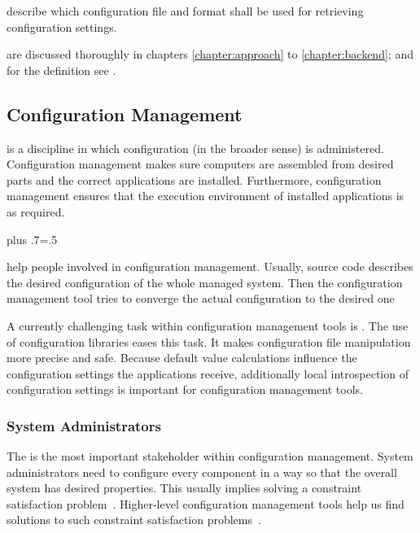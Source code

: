 \begin{description}[font=\textintro]
\item[Access specification] 
describe which configuration file and format shall be used for retrieving configuration settings.

\item[Context specifications] 
are discussed thoroughly in chapters \ref{chapter:approach} to \ref{chapter:backend}; and for the definition see .
\end{description}


\subsection{Configuration Management}
\label{sec:background-configuration-management}

is a discipline in which configuration (in the broader sense) is administered.
Configuration management makes sure computers are assembled from desired parts and the correct applications are installed.
Furthermore, configuration management ensures that the execution environment of installed applications is as required.%
{\parfillskip=0pt plus .7\textwidth \emergencystretch=.5\textwidth \par}

help people involved in configuration management.
Usually, source code describes the desired configuration of the whole managed system.
Then the configuration management tool tries to converge the actual configuration to the desired one~\cite{burgess1995cfengine}

A currently challenging task within configuration management tools is .
The use of configuration libraries eases this task.
It makes configuration file manipulation more precise and safe.
Because default value calculations influence the configuration settings the applications receive, additionally local introspection of configuration settings is important for configuration management tools.


\subsubsection{System Administrators}

The 
is the most important stakeholder within configuration management.
System administrators need to configure every component in a way so that the overall system has desired properties.
This usually implies solving a constraint satisfaction problem~\cite{sabin1998product}.
Higher-level configuration management tools help us find solutions to such constraint satisfaction problems~\cite{cons2002pan,huang2015confvalley}.

